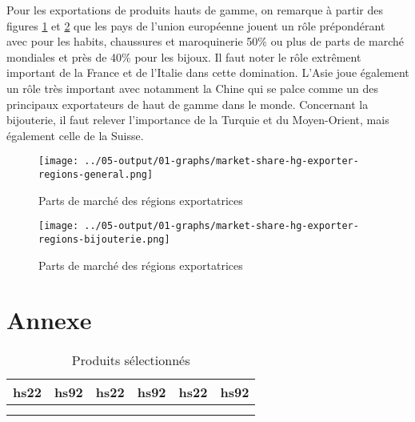 \documentclass[french,10pt,a4paper]{article}
\begin{document}
Pour les exportations de produits hauts de gamme, on remarque à partir des figures \ref{fig:market-share-hg-exporter-regions-general} et \ref{fig:market-share-hg-exporter-regions-bijouterie} que les pays de l'union européenne jouent un rôle prépondérant avec pour les habits, chaussures et maroquinerie 50\% ou plus de parts de marché mondiales et près de 40\% pour les bijoux. Il faut noter le rôle extrêment important de la France et de l'Italie dans cette domination. L'Asie joue également un rôle très important avec notamment la Chine qui se palce comme un des principaux exportateurs de haut de gamme dans le monde. Concernant la bijouterie, il faut relever l'importance de la Turquie et du Moyen-Orient, mais également celle de la Suisse. 

\begin{figure}[!h]
  \centering \texttt{[image: ../05-output/01-graphs/market-share-hg-exporter-regions-general.png]}
  \caption{Parts de marché des régions exportatrices}
  \label{fig:market-share-hg-exporter-regions-general}
\end{figure}

\begin{figure}[!h]
  \centering \texttt{[image: ../05-output/01-graphs/market-share-hg-exporter-regions-bijouterie.png]}
  \caption{Parts de marché des régions exportatrices}
  \label{fig:market-share-hg-exporter-regions-bijouterie}
\end{figure}




\newpage
\section{Annexe}

\begin{longtable}{|ll|ll|ll|}
  hs22 & hs92 & hs22 & hs92 & hs22 & hs92 \\
  \hline 
  \\
  \hline 
  \caption{Produits sélectionnés}
  \label{tab:table-products-init}
 \end{longtable}


 
\newpage


\end{document}
